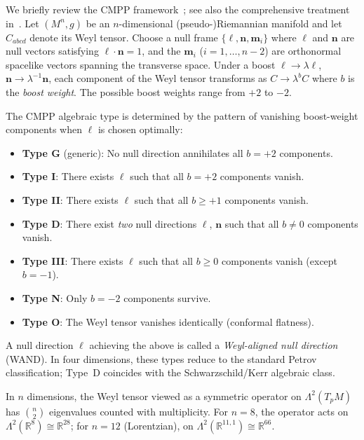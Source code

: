 \documentclass[12pt]{article}
\theoremstyle{definition}
\theoremstyle{remark}
\begin{document}
We briefly review the CMPP framework~\cite{CMPP2004,Ortaggio2013}; see also the comprehensive treatment in~\cite{Durkee2010}.  Let $(M^n,g)$ be an $n$-dimensional (pseudo-)Riemannian manifold and let $C_{abcd}$ denote its Weyl tensor.  Choose a null frame $\{\boldsymbol{\ell}, \boldsymbol{n}, \boldsymbol{m}_i\}$ where $\boldsymbol{\ell}$ and $\boldsymbol{n}$ are null vectors satisfying $\boldsymbol{\ell}\cdot\boldsymbol{n}=1$, and the $\boldsymbol{m}_i$ ($i=1,\ldots,n-2$) are orthonormal spacelike vectors spanning the transverse space.  Under a boost $\boldsymbol{\ell}\to\lambda\boldsymbol{\ell}$, $\boldsymbol{n}\to\lambda^{-1}\boldsymbol{n}$, each component of the Weyl tensor transforms as $C\to\lambda^b C$ where $b$ is the \emph{boost weight}.  The possible boost weights range from $+2$ to $-2$.

The CMPP algebraic type is determined by the pattern of vanishing boost-weight components when $\boldsymbol{\ell}$ is chosen optimally:
\begin{itemize}
    \item \textbf{Type G} (generic): No null direction annihilates all $b=+2$ components.
    \item \textbf{Type I}: There exists $\boldsymbol{\ell}$ such that all $b=+2$ components vanish.
    \item \textbf{Type II}: There exists $\boldsymbol{\ell}$ such that all $b\geq+1$ components vanish.
    \item \textbf{Type D}: There exist \emph{two} null directions $\boldsymbol{\ell}$, $\boldsymbol{n}$ such that all $b\neq0$ components vanish.
    \item \textbf{Type III}: There exists $\boldsymbol{\ell}$ such that all $b\geq0$ components vanish (except $b=-1$).
    \item \textbf{Type N}: Only $b=-2$ components survive.
    \item \textbf{Type O}: The Weyl tensor vanishes identically (conformal flatness).
\end{itemize}
A null direction $\boldsymbol{\ell}$ achieving the above is called a \emph{Weyl-aligned null direction} (WAND).  In four dimensions, these types reduce to the standard Petrov classification; Type~D coincides with the Schwarzschild/Kerr algebraic class.

In $n$ dimensions, the Weyl tensor viewed as a symmetric operator on $\Lambda^2(T_pM)$ has $\binom{n}{2}$ eigenvalues counted with multiplicity.  For $n=8$, the operator acts on $\Lambda^2(\mathbb{R}^8)\cong\mathbb{R}^{28}$; for $n=12$ (Lorentzian), on $\Lambda^2(\mathbb{R}^{11,1})\cong\mathbb{R}^{66}$.
\end{document}
